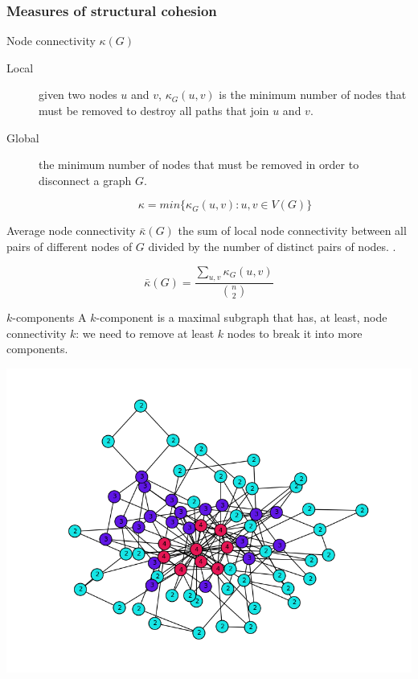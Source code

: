 \documentclass[ignorenonframetext,red,8pt,notes=show]{beamer}
\begin{document}
\begin{frame}
\frametitle{Measures of structural cohesion}

\begin{block}{Node connectivity $\kappa(G)$}
\begin{description}
\item[Local] given two nodes $u$ and $v$, $\kappa_{G}(u,v)$ is the minimum number of nodes that must be removed to destroy all paths that join $u$ and $v$.

\item[Global] the minimum number of nodes that must be removed in order to disconnect a graph $G$.

\begin{equation*}
\kappa = min{\{\kappa_{G}(u,v):u,v \in V(G)\}}
\end{equation*}

\end{description}

\end{block}

\begin{block}{Average node connectivity $\bar{\kappa}(G)$}
the sum of local node connectivity between all pairs of different nodes of $G$ divided by the number of distinct pairs of nodes. \citep*{beineke:2002}.

\begin{equation*}
\bar{\kappa}(G) = \frac{\sum_{u,v} \kappa_{G}(u,v)}{{n \choose 2}}
\end{equation*}
\end{block}

\begin{block}{$k$-components}
A $k$-component is a maximal subgraph that has, at least, node connectivity $k$: we need to remove at least $k$ nodes to break it into more components. 
\end{block}

\begin{center}
\includegraphics[scale=0.25]{img/knum_colors}
\end{center}

\end{frame}
\end{document}
